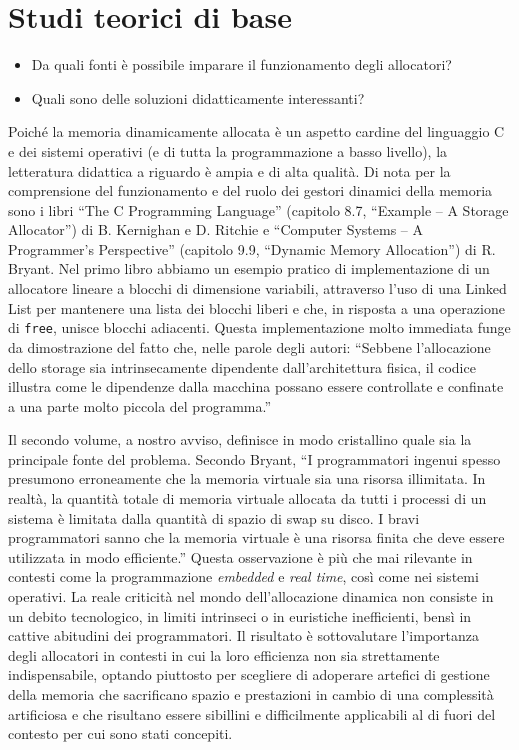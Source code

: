 \documentclass[noexaminfo]{sapthesis}
\begin{document}
\section{Studi teorici di base}
\begin{itemize}
  \item Da quali fonti è possibile imparare il funzionamento degli allocatori?
  \item Quali sono delle soluzioni didatticamente interessanti?
\end{itemize}

Poiché la memoria dinamicamente allocata è un aspetto cardine del linguaggio C e dei sistemi operativi (e di tutta la programmazione a basso livello), la letteratura didattica a riguardo è ampia e di alta qualità. Di nota per la comprensione del funzionamento e del ruolo dei gestori dinamici della memoria sono i libri ``The C Programming Language'' (capitolo 8.7, ``Example – A Storage Allocator'') di B. Kernighan e D. Ritchie e ``Computer Systems – A Programmer’s Perspective'' (capitolo 9.9, ``Dynamic Memory Allocation'') di R. Bryant. Nel primo libro abbiamo un esempio pratico di implementazione di un allocatore lineare a blocchi di dimensione variabili, attraverso l’uso di una Linked List per mantenere una lista dei blocchi liberi e che, in risposta a una operazione di \texttt{free}, unisce blocchi adiacenti. Questa implementazione molto immediata funge da dimostrazione del fatto che, nelle parole degli autori: ``Sebbene l'allocazione dello storage sia intrinsecamente dipendente dall’architettura fisica, il codice illustra come le dipendenze dalla macchina possano essere controllate e confinate a una parte molto piccola del programma.''

Il secondo volume, a nostro avviso, definisce in modo cristallino quale sia la principale fonte del problema. Secondo Bryant, ``I programmatori ingenui spesso presumono erroneamente che la memoria virtuale sia una risorsa illimitata. In realtà, la quantità totale di memoria virtuale allocata da tutti i processi di un sistema è limitata dalla quantità di spazio di swap su disco. I bravi programmatori sanno che la memoria virtuale è una risorsa finita che deve essere utilizzata in modo efficiente.'' Questa osservazione è più che mai rilevante in contesti come la programmazione \textit{embedded} e \textit{real time}, così come nei sistemi operativi. La reale criticità nel mondo dell’allocazione dinamica non consiste in un debito tecnologico, in limiti intrinseci o in euristiche inefficienti, bensì in cattive abitudini dei programmatori. Il risultato è sottovalutare l’importanza degli allocatori in contesti in cui la loro efficienza non sia strettamente indispensabile, optando piuttosto per scegliere di adoperare artefici di gestione della memoria che sacrificano spazio e prestazioni in cambio di una complessità artificiosa e che risultano essere sibillini e difficilmente applicabili al di fuori del contesto per cui sono stati concepiti.
\end{document}

